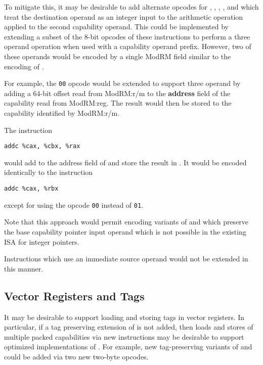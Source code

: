 To mitigate this, it may be desirable to add alternate opcodes for
, , , ,
and  which treat the destination operand as an integer
input to the arithmetic operation applied to the second capability
operand.  This could be implemented by extending a subset of the 8-bit
opcodes of these instructions to perform a three operand operation
when used with a capability operand prefix.  However, two of these
operands would be encoded by a single ModRM field similar to the
encoding of .

For example, the \texttt{00} opcode would be extended to support three
operand  by adding a 64-bit offset read from
ModRM:r/m to the \textbf{address} field of the capability read from
ModRM:reg.  The result would then be stored to the capability
identified by ModRM:r/m.

The instruction

\begin{verbatim}
addc %cax, %cbx, %rax
\end{verbatim}

would add \RAX{} to the address field of \CBX{} and store the result
in \CAX{}.  It would be encoded identically to the instruction

\begin{verbatim}
addc %cax, %rbx
\end{verbatim}

except for using the opcode \texttt{00} instead of \texttt{01}.

Note that this approach would permit encoding variants of
 and  which preserve the
base capability pointer input operand which is not possible in the
existing ISA for integer pointers.

Instructions which use an immediate source operand would not be
extended in this manner.

\subsection{Vector Registers and Tags}

It may be desirable to support loading and storing tags in vector
registers.  In particular, if a tag preserving extension of
 is not added, then loads and stores of multiple
packed capabilities via new instructions may be desirable to support
optimized implementations of .  For example, new
tag-preserving variants of  and 
could be added via two new two-byte opcodes.


